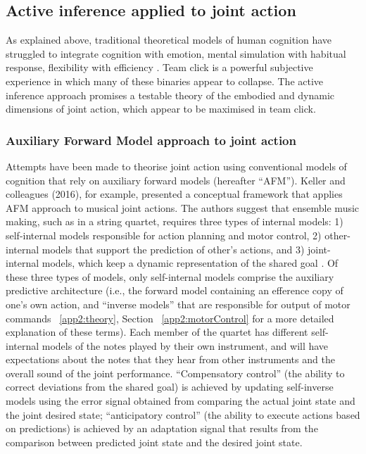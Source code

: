 \begin{CJK}{UTF8}{gbsn}

\subsection{Active inference applied to joint action \label{sect:activeInfJA}}

As explained above, traditional theoretical models of human cognition have struggled to integrate cognition with emotion, mental simulation with habitual response, flexibility with efficiency \citep{Clark2015}.
Team click is a powerful subjective experience in which many of these binaries appear to collapse.  The active inference approach promises a testable theory of the embodied and dynamic dimensions of joint action, which appear to be maximised in team click.

\subsubsection{Auxiliary Forward Model approach to joint action}
Attempts have been made to theorise joint action using conventional models of cognition that rely on auxiliary forward models (hereafter ``AFM'').  Keller and colleagues (2016), for example, presented a conceptual framework that applies AFM approach to musical joint actions.  The authors suggest that ensemble music making, such as in a string quartet, requires three types of internal models: 1) self-internal models responsible for action planning and motor control, 2) other-internal models that support the prediction of other’s actions, and 3) joint-internal models, which keep a dynamic representation of the shared goal \citep{Keller2016}.  Of these three types of models, only self-internal models comprise the auxiliary predictive architecture (i.e., the forward model containing an efference copy of one's own action, and ``inverse models'' that are responsible for output of motor commands ~\ref{app2:theory}, Section ~\ref{app2:motorControl} for a more detailed explanation of these terms).  Each member of the quartet has different self-internal models of the notes played by their own instrument, and will have expectations about the notes that they hear from other instruments and the overall sound of the joint performance.  ``Compensatory control'' (the ability to correct deviations from the shared goal) is achieved by updating self-inverse models using the error signal obtained from comparing the actual joint state and the joint desired state; ``anticipatory control'' (the ability to execute actions based on predictions) is achieved by an adaptation signal that results from the comparison between predicted joint state and the desired joint state.


\end{CJK}
